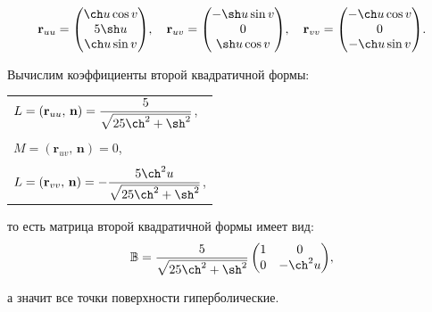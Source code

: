 \documentclass[12pt,a4paper]{article}
\newcommand{\boldVec}[1]{\mathbf #1}
\newcommand{\scalarProduct}[2]{(\boldVec #1,\, \boldVec #2)}
\begin{document}
    \[
        \boldVec{r}_{uu} = 
            \begin{pmatrix}
                \ch u \cos v
                \\
                5 \sh u
                \\
                \ch u \sin v
            \end{pmatrix}
            \!,\quad
        \boldVec{r}_{uv} = 
            \begin{pmatrix}
                - \sh u \sin v
                \\
                0
                \\
                \sh u \cos v
            \end{pmatrix}
            \!,\quad
        \boldVec{r}_{vv} = 
            \begin{pmatrix}
                - \ch u \cos v
                \\
                0
                \\
                - \ch u \sin v
            \end{pmatrix}\! .
    \]

    Вычислим коэффициенты второй квадратичной формы:
    \begin{table}[h]
        \centering
        \begin{tabular}{l}
            $ L = \scalarProduct{r_{uu}}{n} = \dfrac{5}{\sqrt{25\ch^2 + \sh^2}}
            $,
            \\ \\
            $ M = \scalarProduct{r_{uv}}{n} = 0
            $,
            \\ \\
            $ L = \scalarProduct{r_{vv}}{n} = -\dfrac{5 \ch^2 u}{\sqrt{25\ch^2 + \sh^2}}
            $,
        \end{tabular}
    \end{table}

    \noindent то есть матрица второй квадратичной формы имеет вид:
    \begin{equation}
        \label{secondSquareForm}
        \mathbb{B} = \dfrac{5}{\sqrt{25\ch^2 + \sh^2}}
        \begin{pmatrix}
            1 & 0
            \\
            0 & -\ch^2 u
        \end{pmatrix}\!, 
    \end{equation}

    \noindent а значит все точки поверхности гиперболические.
\end{document}
